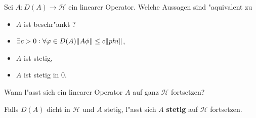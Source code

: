 \documentclass[9pt]{article}
\newcommand{\Hi}{\mathcal{H}}
\newenvironment{field}{}{\newpage}
\newif\ifnote
\newenvironment{note}{\notetrue}{\notefalse}
\newcommand{\localtag}{}
\newcommand{\globaltag}{}
\newcommand{\uuid}{}
\newcommand{\tags}[1]{
    \ifnote 
        \renewcommand{\localtag}{#1}
    \else
        \renewcommand{\globaltag}{#1}
    \fi 
    }
\newcommand{\xplain}[1]{\renewcommand{\uuid}{#1}}
\begin{document}
	\begin{note}
		\xplain{c8e07072-d74a-4c22-97cf-551bf429f5d6}
		\tags{6.1.4, satz}
		
		\begin{field}  %
			Sei $A:D(A) \rightarrow \Hi$ ein linearer Operator. Welche Aussagen sind "aquivalent zu
			\begin{itemize}
				\item $A$ ist beschr"ankt ?
			\end{itemize}
		\end{field}
		
		\begin{field}  %
			\begin{itemize}
				\item $\exists c>0 : \forall \varphi \in D(A) \norm{A\phi} \leq c\norm{phi}$,
				\item $A$ ist stetig,
				\item $A$ ist stetig in 0.
			\end{itemize}
		\end{field}
		
		\begin{field}  %
			Wann l"asst sich ein linearer Operator $A$ auf ganz $\Hi$ fortsetzen?
		\end{field}
		
		\begin{field}  %
			Falls $D(A)$ dicht in $\Hi$ und $A$ stetig, l"asst sich $A$ \textbf{stetig} auf $\Hi$ fortsetzen.
		\end{field}
	\end{note}
\end{document}
